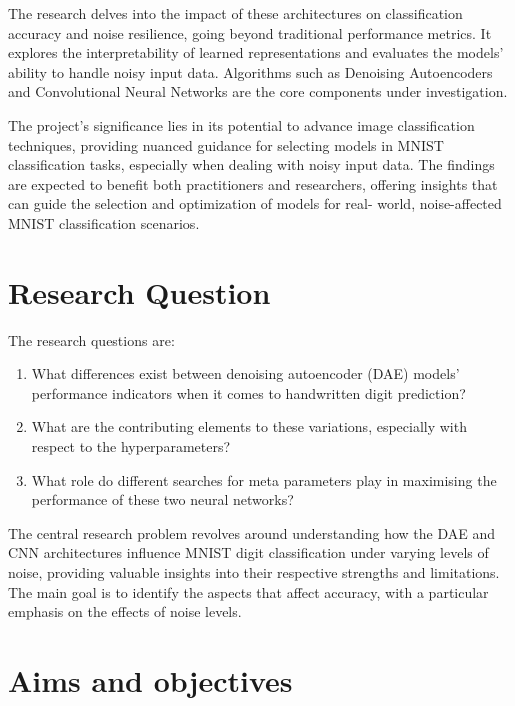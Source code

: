 The research delves into the impact of these architectures on classification accuracy and noise 
resilience, going beyond traditional performance metrics. It explores the interpretability of 
learned representations and evaluates the models' ability to handle noisy input data. 
Algorithms such as Denoising Autoencoders and Convolutional Neural Networks are the core 
components under investigation.

The project's significance lies in its potential to advance image classification techniques, 
providing nuanced guidance for selecting models in MNIST classification tasks, especially when 
dealing with noisy input data. The findings are expected to benefit both practitioners and 
researchers, offering insights that can guide the selection and optimization of models for real-
world, noise-affected MNIST classification scenarios.


\section{Research Question}
\label{sec:intro_prob_art}
The research questions are: 
\begin{enumerate}
    \item What differences exist between denoising autoencoder (DAE) models' performance indicators when it comes to handwritten digit prediction?
    \item What are the contributing elements to these variations, especially with respect to the hyperparameters?  
    \item What role do different searches for meta parameters play in maximising the performance of these two neural networks?
\end{enumerate}

The central research problem 
revolves around understanding how the DAE and CNN architectures influence MNIST digit 
classification under varying levels of noise, providing valuable insights into their respective 
strengths and limitations. The main goal is to identify the aspects that affect accuracy, with 
a particular emphasis on the effects of noise levels.

\section{Aims and objectives}
\label{sec:intro_aims_obj}

